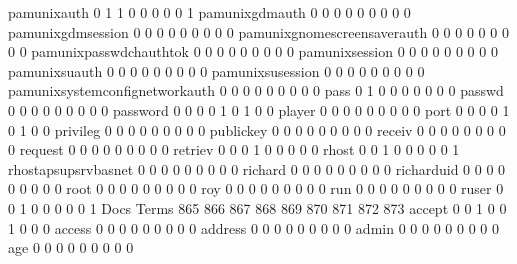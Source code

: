 \documentclass[compress,8pt]{beamer}
\begin{document}
\begin{frame}
\begin{Schunk}
  pamunixauth                                0   1   1   0   0   0   0   0   1
  pamunixgdmauth                             0   0   0   0   0   0   0   0   0
  pamunixgdmsession                          0   0   0   0   0   0   0   0   0
  pamunixgnomescreensaverauth                0   0   0   0   0   0   0   0   0
  pamunixpasswdchauthtok                     0   0   0   0   0   0   0   0   0
  pamunixsession                             0   0   0   0   0   0   0   0   0
  pamunixsuauth                              0   0   0   0   0   0   0   0   0
  pamunixsusession                           0   0   0   0   0   0   0   0   0
  pamunixsystemconfignetworkauth             0   0   0   0   0   0   0   0   0
  pass                                       0   1   0   0   0   0   0   0   0
  passwd                                     0   0   0   0   0   0   0   0   0
  password                                   0   0   0   0   1   0   1   0   0
  player                                     0   0   0   0   0   0   0   0   0
  port                                       0   0   0   0   1   0   1   0   0
  privileg                                   0   0   0   0   0   0   0   0   0
  publickey                                  0   0   0   0   0   0   0   0   0
  receiv                                     0   0   0   0   0   0   0   0   0
  request                                    0   0   0   0   0   0   0   0   0
  retriev                                    0   0   0   1   0   0   0   0   0
  rhost                                      0   0   1   0   0   0   0   0   1
  rhostapsupsrvbasnet                        0   0   0   0   0   0   0   0   0
  richard                                    0   0   0   0   0   0   0   0   0
  richarduid                                 0   0   0   0   0   0   0   0   0
  root                                       0   0   0   0   0   0   0   0   0
  roy                                        0   0   0   0   0   0   0   0   0
  run                                        0   0   0   0   0   0   0   0   0
  ruser                                      0   0   1   0   0   0   0   0   1
                                          Docs
Terms                                      865 866 867 868 869 870 871 872 873
  accept                                     0   0   1   0   0   1   0   0   0
  access                                     0   0   0   0   0   0   0   0   0
  address                                    0   0   0   0   0   0   0   0   0
  admin                                      0   0   0   0   0   0   0   0   0
  age                                        0   0   0   0   0   0   0   0   0

\end{Schunk}
\end{frame}
\end{document}

